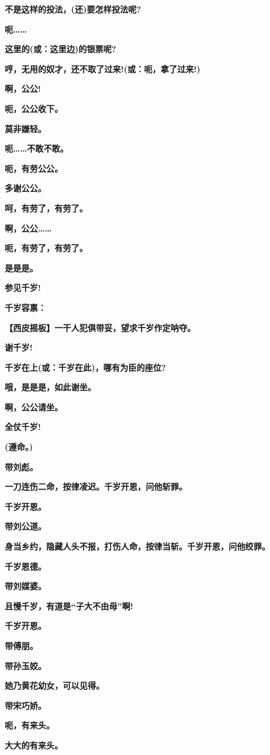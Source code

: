 \textbf{不是这样的投法，(还)要怎样投法呢?}

\textbf{呃\ldots{}\ldots{}}

\textbf{这里的(或：这里边)的银票呢?}

\textbf{哼，无用的奴才，还不取了过来!(或：呃，拿了过来!)}

\textbf{啊，公公!}

\textbf{呃，公公收下。}

\textbf{莫非嫌轻。}

\textbf{呃\ldots{}\ldots{}不敢不敢。}

\textbf{呃，有劳公公。}

\textbf{多谢公公。}

\textbf{呵，有劳了，有劳了。}

\textbf{啊，公公\ldots{}\ldots{}}

\textbf{呃，有劳了，有劳了。}

\textbf{是是是。}

\textbf{参见千岁!}

\textbf{千岁容禀：}

\textbf{【西皮摇板】一干人犯俱带妥，望求千岁作定呐夺。}

\textbf{谢千岁!}

\textbf{千岁在上(或：千岁在此)，哪有为臣的座位?}

\textbf{哦，是是是，如此谢坐。}

\textbf{啊，公公请坐。}

\textbf{全仗千岁!}

\textbf{(遵命。)}

\textbf{带刘彪。}

\textbf{一刀连伤二命，按律凌迟。千岁开恩，问他斩罪。}

\textbf{千岁开恩。}

\textbf{带刘公道。}

\textbf{身当乡约，隐藏人头不报，打伤人命，按律当斩。千岁开恩，问他绞罪。}

\textbf{千岁恩德。}

\textbf{带刘媒婆。}

\textbf{且慢千岁，有道是``子大不由母''啊!}

\textbf{千岁开恩。}

\textbf{带傅朋。}

\textbf{带孙玉姣。}

\textbf{她乃黄花幼女，可以见得。}

\textbf{带宋巧娇。}

\textbf{呃，有来头。}

\textbf{大大的有来头。}

